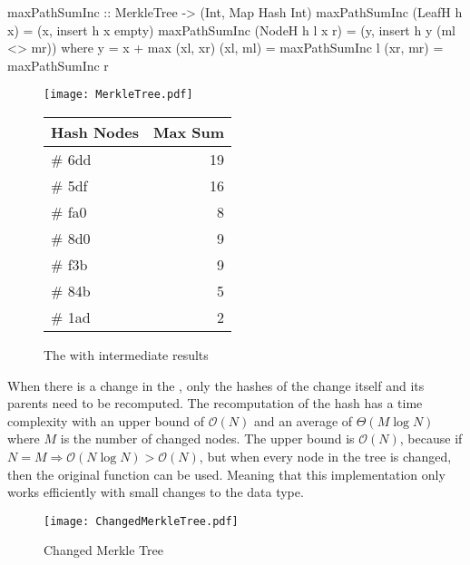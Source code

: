 \begin{haskell}
maxPathSumInc :: MerkleTree -> (Int, Map Hash Int)    
maxPathSumInc (LeafH h x)     = (x, insert h x empty)
maxPathSumInc (NodeH h l x r) = (y, insert h y (ml <> mr))  
  where
    y = x + max (xl, xr)
    (xl, ml) = maxPathSumInc l
    (xr, mr) = maxPathSumInc r
\end{haskell}
\vspace{15pt}
\begin{figure}[H]
    \begin{minipage}[c]{0.55\textwidth}
        \centering
        \texttt{[image: MerkleTree.pdf]}
    \end{minipage}
    \hspace{0.1\textwidth}
    \begin{minipage}[c]{0.35\textwidth}
        \centering
        \begin{tabular}{|l|r|}
            \hline
            \textbf{Hash Nodes} & \textbf{Max Sum} \\
            \hline
            \# 6dd & 19 \\
            \hline
            \# 5df & 16 \\
            \hline
            \# fa0 & 8 \\
            \hline
            \# 8d0 & 9 \\
            \hline
            \# f3b & 9 \\
            \hline
            \# 84b & 5 \\
            \hline
            \# 1ad & 2 \\
            \hline
        \end{tabular}
    \end{minipage}
    \caption{The  with intermediate results}    
\end{figure}

When there is a change in the , only the hashes of the change itself and its parents need to be recomputed. The recomputation of the hash has a time complexity with an upper bound of $\mathcal{O}(N)$ and an average of $\Theta(M \log{N})$ where $M$ is the number of changed nodes. The upper bound is $\mathcal{O}(N)$, because if $N = M \Rightarrow \mathcal{O}(N \log{N}) > \mathcal{O}(N)$, but when every node in the tree is changed, then the original function can be used. Meaning that this implementation only works efficiently with small changes to the data type.

\begin{figure}[H]
    \centering
    \texttt{[image: ChangedMerkleTree.pdf]}
    \caption{Changed Merkle Tree}
\end{figure}

